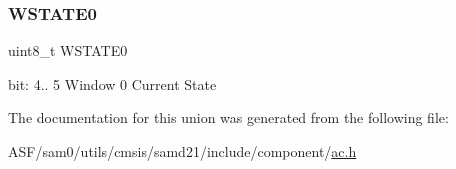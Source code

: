 \subsubsection{\texorpdfstring{WSTATE0}{WSTATE0}}
{\footnotesize\ttfamily uint8\+\_\+t W\+S\+T\+A\+T\+E0}

bit\+: 4.. 5 Window 0 Current State 

The documentation for this union was generated from the following file\+:\begin{DoxyCompactItemize}
\item 
A\+S\+F/sam0/utils/cmsis/samd21/include/component/\mbox{\hyperlink{component_2ac_8h}{ac.\+h}}\end{DoxyCompactItemize}
